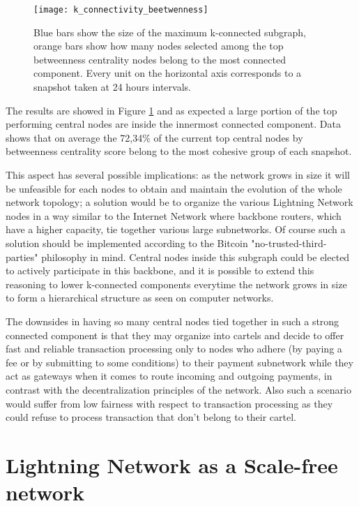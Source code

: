 	\begin{figure}
		\texttt{[image: k\_connectivity\_beetwenness]}
		\caption{Blue bars show the size of the maximum k-connected subgraph, orange bars show how many nodes selected among the top betweenness centrality nodes belong to the most connected component. Every unit on the horizontal axis corresponds to a snapshot taken at 24 hours intervals.}
		\label{monthyl_k_connectivity_betweenness}
	\end{figure}
	
	The results are showed in Figure \ref{monthyl_k_connectivity_betweenness} and as expected a large portion of the top performing central nodes are inside the innermost connected component. Data shows that on average the 72,34\% of the current top central nodes by betweenness centrality score belong to the most cohesive group of each snapshot.
	
	This aspect has several possible implications: as the network grows in size it will be unfeasible for each nodes to obtain and maintain the evolution of the whole network topology; a solution would be to organize the various Lightning Network nodes in a way similar to the Internet Network where backbone routers, which have a higher capacity, tie together various large subnetworks. Of course such a solution should be implemented according to the Bitcoin "no-trusted-third-parties" philosophy in mind. Central nodes inside this subgraph could be elected to actively participate in this backbone, and it is possible to extend this reasoning to lower k-connected components everytime the network grows in size to form a hierarchical structure as seen on computer networks. 
	
	The downsides in having so many central nodes tied together in such a strong connected component is that they may organize into cartels and decide to offer fast and reliable transaction processing only to nodes who adhere (by paying a fee or by submitting to some conditions) to their payment subnetwork while they act as gateways when it comes to route incoming and outgoing payments, in contrast with the decentralization principles of the network. Also such a scenario would suffer from low fairness with respect to transaction processing as they could refuse to process transaction that don't belong to their cartel.

	\section{Lightning Network as a Scale-free network}
	
